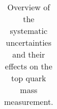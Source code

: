\begin{table}[!htp]
\begin{tabular}{|l|c|}
\end{tabular}
\caption{\label{tab:top_mass_systematics}Overview of the systematic uncertainties
and their effects on the top quark mass measurement.}
\end{table}








